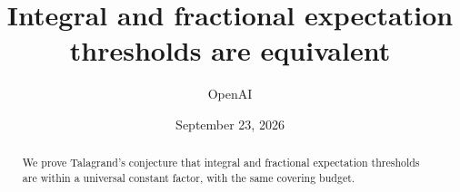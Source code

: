 \documentclass[11pt]{article}
\title{Integral and fractional expectation thresholds are equivalent}
\author{OpenAI}
\date{September 23, 2026}
\theoremstyle{remark}
\numberwithin{equation}{section}
\begin{document}
\maketitle
\begin{abstract}
We prove Talagrand's conjecture that integral and fractional expectation
thresholds are within a universal constant factor, with the same covering
budget.
\end{abstract}





\end{document}
